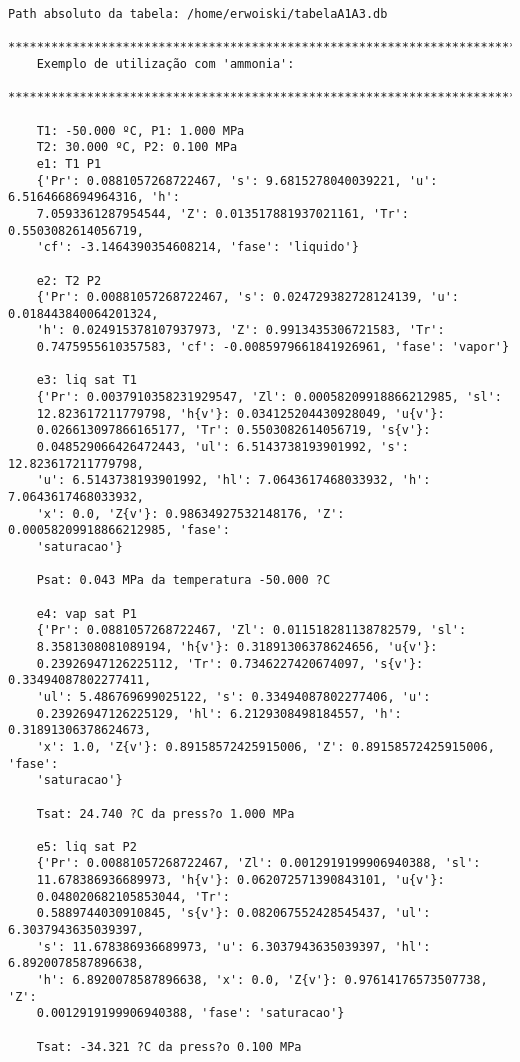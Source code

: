 \begin{Verbatim}[baselinestretch=1.0,fontsize=\scriptsize]
    Path absoluto da tabela: /home/erwoiski/tabelaA1A3.db
    ********************************************************************************
    Exemplo de utilização com 'ammonia':
    ********************************************************************************

    T1: -50.000 ºC, P1: 1.000 MPa
    T2: 30.000 ºC, P2: 0.100 MPa
    e1: T1 P1
    {'Pr': 0.0881057268722467, 's': 9.6815278040039221, 'u': 6.5164668694964316, 'h':
    7.0593361287954544, 'Z': 0.013517881937021161, 'Tr': 0.5503082614056719,
    'cf': -3.1464390354608214, 'fase': 'liquido'}

    e2: T2 P2
    {'Pr': 0.00881057268722467, 's': 0.024729382728124139, 'u': 0.018443840064201324,
    'h': 0.024915378107937973, 'Z': 0.9913435306721583, 'Tr':
    0.7475955610357583, 'cf': -0.0085979661841926961, 'fase': 'vapor'}

    e3: liq sat T1
    {'Pr': 0.0037910358231929547, 'Zl': 0.00058209918866212985, 'sl':
    12.823617211779798, 'h{v'}: 0.034125204430928049, 'u{v'}:
    0.026613097866165177, 'Tr': 0.5503082614056719, 's{v'}:
    0.048529066426472443, 'ul': 6.5143738193901992, 's': 12.823617211779798,
    'u': 6.5143738193901992, 'hl': 7.0643617468033932, 'h': 7.0643617468033932,
    'x': 0.0, 'Z{v'}: 0.98634927532148176, 'Z': 0.00058209918866212985, 'fase':
    'saturacao'}

    Psat: 0.043 MPa da temperatura -50.000 ?C

    e4: vap sat P1
    {'Pr': 0.0881057268722467, 'Zl': 0.011518281138782579, 'sl':
    8.3581308081089194, 'h{v'}: 0.31891306378624656, 'u{v'}:
    0.23926947126225112, 'Tr': 0.7346227420674097, 's{v'}: 0.33494087802277411,
    'ul': 5.486769699025122, 's': 0.33494087802277406, 'u':
    0.23926947126225129, 'hl': 6.2129308498184557, 'h': 0.31891306378624673,
    'x': 1.0, 'Z{v'}: 0.89158572425915006, 'Z': 0.89158572425915006, 'fase':
    'saturacao'}

    Tsat: 24.740 ?C da press?o 1.000 MPa

    e5: liq sat P2
    {'Pr': 0.00881057268722467, 'Zl': 0.0012919199906940388, 'sl':
    11.678386936689973, 'h{v'}: 0.062072571390843101, 'u{v'}:
    0.048020682105853044, 'Tr':
    0.5889744030910845, 's{v'}: 0.082067552428545437, 'ul': 6.3037943635039397,
    's': 11.678386936689973, 'u': 6.3037943635039397, 'hl': 6.8920078587896638,
    'h': 6.8920078587896638, 'x': 0.0, 'Z{v'}: 0.97614176573507738, 'Z':
    0.0012919199906940388, 'fase': 'saturacao'}

    Tsat: -34.321 ?C da press?o 0.100 MPa


\end{Verbatim}

